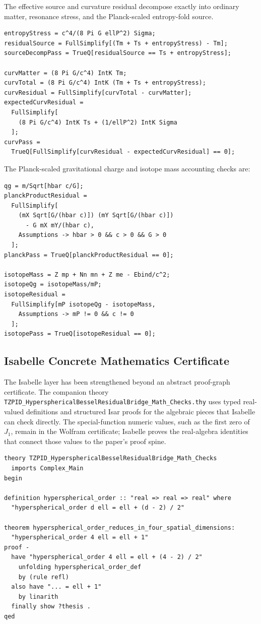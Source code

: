 \documentclass[11pt,a4paper]{article}
\begin{document}
The effective source and curvature residual decompose exactly into ordinary matter, resonance stress, and the Planck-scaled entropy-fold source.

\begin{lstlisting}
entropyStress = c^4/(8 Pi G ellP^2) Sigma;
residualSource = FullSimplify[(Tm + Ts + entropyStress) - Tm];
sourceDecompPass = TrueQ[residualSource == Ts + entropyStress];

curvMatter = (8 Pi G/c^4) IntK Tm;
curvTotal = (8 Pi G/c^4) IntK (Tm + Ts + entropyStress);
curvResidual = FullSimplify[curvTotal - curvMatter];
expectedCurvResidual =
  FullSimplify[
    (8 Pi G/c^4) IntK Ts + (1/ellP^2) IntK Sigma
  ];
curvPass =
  TrueQ[FullSimplify[curvResidual - expectedCurvResidual] == 0];
\end{lstlisting}

The Planck-scaled gravitational charge and isotope mass accounting checks are:

\begin{lstlisting}
qg = m/Sqrt[hbar c/G];
planckProductResidual =
  FullSimplify[
    (mX Sqrt[G/(hbar c)]) (mY Sqrt[G/(hbar c)])
      - G mX mY/(hbar c),
    Assumptions -> hbar > 0 && c > 0 && G > 0
  ];
planckPass = TrueQ[planckProductResidual == 0];

isotopeMass = Z mp + Nn mn + Z me - Ebind/c^2;
isotopeQg = isotopeMass/mP;
isotopeResidual =
  FullSimplify[mP isotopeQg - isotopeMass,
    Assumptions -> mP != 0 && c != 0
  ];
isotopePass = TrueQ[isotopeResidual == 0];
\end{lstlisting}

\subsection{Isabelle Concrete Mathematics Certificate}

The Isabelle layer has been strengthened beyond an abstract proof-graph certificate. The companion theory \texttt{TZPID\_HypersphericalBesselResidualBridge\_Math\_Checks.thy} uses typed real-valued definitions and structured Isar proofs for the algebraic pieces that Isabelle can check directly. The special-function numeric values, such as the first zero of $J_1$, remain in the Wolfram certificate; Isabelle proves the real-algebra identities that connect those values to the paper's proof spine.

\begin{lstlisting}
theory TZPID_HypersphericalBesselResidualBridge_Math_Checks
  imports Complex_Main
begin

definition hyperspherical_order :: "real => real => real" where
  "hyperspherical_order d ell = ell + (d - 2) / 2"

theorem hyperspherical_order_reduces_in_four_spatial_dimensions:
  "hyperspherical_order 4 ell = ell + 1"
proof -
  have "hyperspherical_order 4 ell = ell + (4 - 2) / 2"
    unfolding hyperspherical_order_def
    by (rule refl)
  also have "... = ell + 1"
    by linarith
  finally show ?thesis .
qed
\end{lstlisting}
\end{document}
